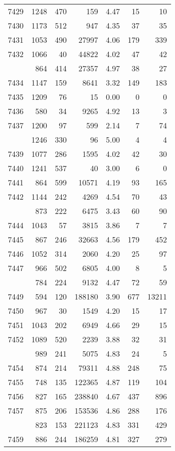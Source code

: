 \documentclass[
]{article}
\begin{document}
\begin{table}
\begin{tabular}[t]{lrrrrrr}
7429 & 1248 & 470 & 159 & 4.47 & 15 & 10\\
7430 & 1173 & 512 & 947 & 4.35 & 37 & 35\\
7431 & 1053 & 490 & 27997 & 4.06 & 179 & 339\\
7432 & 1066 & 40 & 44822 & 4.02 & 47 & 42\\
\addlinespace
7433 & 864 & 414 & 27357 & 4.97 & 38 & 27\\
7434 & 1147 & 159 & 8641 & 3.32 & 149 & 183\\
7435 & 1209 & 76 & 15 & 0.00 & 0 & 0\\
7436 & 580 & 34 & 9265 & 4.92 & 13 & 3\\
7437 & 1200 & 97 & 599 & 2.14 & 7 & 74\\
\addlinespace
7438 & 1246 & 330 & 96 & 5.00 & 4 & 4\\
7439 & 1077 & 286 & 1595 & 4.02 & 42 & 30\\
7440 & 1241 & 537 & 40 & 3.00 & 6 & 0\\
7441 & 864 & 599 & 10571 & 4.19 & 93 & 165\\
7442 & 1144 & 242 & 4269 & 4.54 & 70 & 43\\
\addlinespace
7443 & 873 & 222 & 6475 & 3.43 & 60 & 90\\
7444 & 1043 & 57 & 3815 & 3.86 & 7 & 7\\
7445 & 867 & 246 & 32663 & 4.56 & 179 & 452\\
7446 & 1052 & 314 & 2060 & 4.20 & 25 & 97\\
7447 & 966 & 502 & 6805 & 4.00 & 8 & 5\\
\addlinespace
7448 & 784 & 224 & 9132 & 4.47 & 72 & 59\\
7449 & 594 & 120 & 188180 & 3.90 & 677 & 13211\\
7450 & 967 & 30 & 1549 & 4.20 & 15 & 17\\
7451 & 1043 & 202 & 6949 & 4.66 & 29 & 15\\
7452 & 1089 & 520 & 2239 & 3.88 & 32 & 31\\
\addlinespace
7453 & 989 & 241 & 5075 & 4.83 & 24 & 5\\
7454 & 874 & 214 & 79311 & 4.88 & 248 & 75\\
7455 & 748 & 135 & 122365 & 4.87 & 119 & 104\\
7456 & 827 & 165 & 238840 & 4.67 & 437 & 896\\
7457 & 875 & 206 & 153536 & 4.86 & 288 & 176\\
\addlinespace
7458 & 823 & 153 & 221123 & 4.83 & 331 & 429\\
7459 & 886 & 244 & 186259 & 4.81 & 327 & 279\\

\end{tabular}
\end{table}
\end{document}
